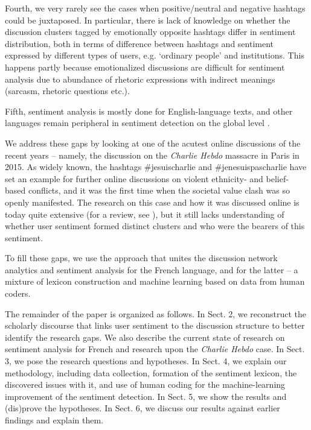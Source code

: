 Fourth, we very rarely see the cases when positive/neutral and negative hashtags could be juxtaposed. In particular, there is lack of knowledge on whether the discussion clusters tagged by emotionally opposite hashtags differ in sentiment distribution, both in terms of difference between hashtags and sentiment expressed by different types of users, e.g. ‘ordinary people’ and institutions. This happens partly because emotionalized discussions are difficult for sentiment analysis due to abundance of rhetoric expressions with indirect meanings (sarcasm, rhetoric questions etc.).

Fifth, sentiment analysis is mostly done for English-language texts, and other languages remain peripheral in sentiment detection on the global level \cite{ChenSkiena}.

We address these gaps by looking at one of the acutest online discussions of the recent years -- namely, the discussion on the \textit{Charlie Hebdo} massacre in Paris in 2015. As widely known, the hashtags \#jesuischarlie and \#jenesuispascharlie have set an example for further online discussions on violent ethnicity- and belief-based conflicts, and it was the first time when the societal value clash was so openly manifested. The research on this case and how it was discussed online is today quite extensive (for a review, see \cite{BodrunovaSmoliarovaBlekanov}), but it still lacks understanding of whether user sentiment formed distinct clusters and who were the bearers of this sentiment.

To fill these gaps, we use the approach that unites the discussion network analytics and sentiment analysis for the French language, and for the latter -- a mixture of lexicon construction and machine learning based on data from human coders.

The remainder of the paper is organized as follows. In Sect. 2, we reconstruct the scholarly discourse that links user sentiment to the discussion structure to better identify the research gaps. We also describe the current state of research on sentiment analysis for French and research upon the \textit{Charlie Hebdo} case. In Sect. 3, we pose the research questions and hypotheses. In Sect. 4, we explain our methodology, including data collection, formation of the sentiment lexicon, the discovered issues with it, and use of human coding for the machine-learning improvement of the sentiment detection. In Sect. 5, we show the results and (dis)prove the hypotheses. In Sect. 6, we discuss our results against earlier findings and explain them.

